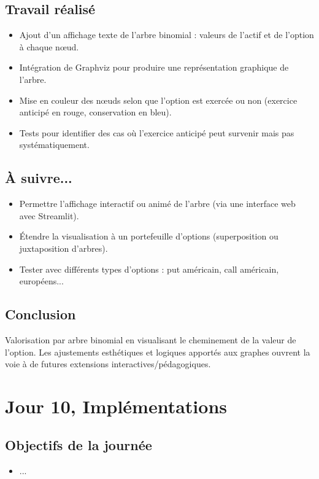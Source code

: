 \documentclass[a4paper,11pt]{article}
\begin{document}
\subsection{Travail réalisé}
\begin{itemize}
    \item Ajout d’un affichage texte de l’arbre binomial : valeurs de l’actif et de l’option à chaque nœud.
    \item Intégration de Graphviz pour produire une représentation graphique de l’arbre.
    \item Mise en couleur des nœuds selon que l’option est exercée ou non (exercice anticipé en rouge, conservation en bleu).
    \item Tests pour identifier des cas où l’exercice anticipé peut survenir mais pas systématiquement.
\end{itemize}

\subsection{À suivre...}
\begin{itemize}
    \item Permettre l'affichage interactif ou animé de l’arbre (via une interface web avec Streamlit).
    \item Étendre la visualisation à un portefeuille d’options (superposition ou juxtaposition d’arbres).
    \item Tester avec différents types d’options : put américain, call américain, européens...
\end{itemize}

\subsection{Conclusion}
Valorisation par arbre binomial en visualisant le cheminement de la valeur de l’option. Les ajustements esthétiques et logiques apportés aux graphes ouvrent la voie à de futures extensions interactives/pédagogiques.
\newpage


\section{Jour 10, Implémentations}
\subsection{Objectifs de la journée}
\begin{itemize}
    \item ...
\end{itemize}
\end{document}
